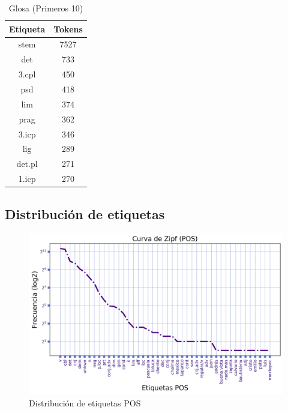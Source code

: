 \documentclass[letterpaper,12pt,oneside]{book}
\theoremstyle{definition}
\begin{document}
	\begin{table}

		\centering

		\begin{tabular}{c | c}                            

			\textbf{Etiqueta} & \textbf{Tokens} \\ \hline \hline

			stem & 7527 \\

			det & 733 \\

			3.cpl & 450 \\

			psd & 418 \\

			lim & 374 \\

			prag & 362 \\

			3.icp & 346 \\

			lig & 289 \\

			det.pl & 271 \\

			1.icp & 270 \\

		\end{tabular}

		\caption{Glosa (Primeros 10)}

		\label{table_gloss_tokens}

	\end{table}

	
	


	\subsection{Distribución de etiquetas}

	
	\begin{figure}

		\centering

		\includegraphics[width=\textwidth]{zipf_pos}

		\caption{Distribución de etiquetas POS}

	\end{figure}
\end{document}
